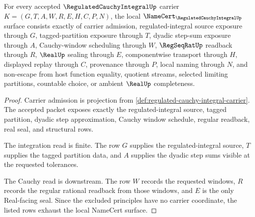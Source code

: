 \begin{theorem}
\label{thm:regulated-cauchy-integral-namecert-obligations}
For every accepted $\RegulatedCauchyIntegralUp$ carrier $K=(G,T,A,W,R,E,H,C,P,N)$, the local $\NameCert_{\RegulatedCauchyIntegralUp}$ surface consists exactly of carrier admission, regulated-integral source exposure through $G$, tagged-partition exposure through $T$, dyadic step-sum exposure through $A$, Cauchy-window scheduling through $W$, $\RegSeqRatUp$ readback through $R$, $\RealUp$ sealing through $E$, componentwise transport through $H$, displayed replay through $C$, provenance through $P$, local naming through $N$, and non-escape from host function equality, quotient streams, selected limiting partitions, countable choice, or ambient $\RealUp$ completeness.
\end{theorem}
\begin{proof}
Carrier admission is projection from \autoref{def:regulated-cauchy-integral-carrier}. The accepted packet exposes exactly the regulated-integral source, tagged partition, dyadic step approximation, Cauchy window schedule, regular readback, real seal, and structural rows.

The integration read is finite. The row $G$ supplies the regulated-integral source, $T$ supplies the tagged partition data, and $A$ supplies the dyadic step sums visible at the requested tolerances.

The Cauchy read is downstream. The row $W$ records the requested windows, $R$ records the regular rational readback from those windows, and $E$ is the only Real-facing seal. Since the excluded principles have no carrier coordinate, the listed rows exhaust the local NameCert surface.
\end{proof}


